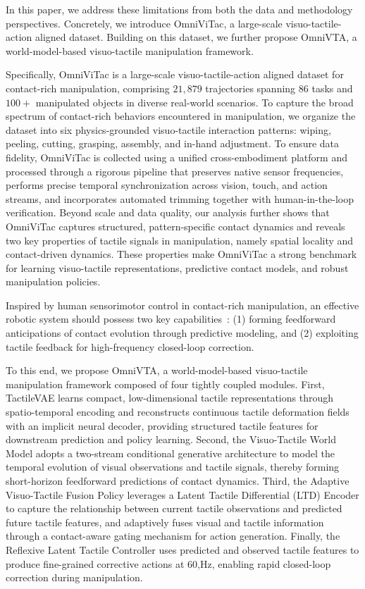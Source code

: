 In this paper, we address these limitations from both the data and methodology perspectives. Concretely, we introduce OmniViTac, a large-scale visuo-tactile-action aligned dataset.
Building on this dataset, we further propose OmniVTA, a world-model-based visuo-tactile manipulation framework.

Specifically, OmniViTac is a large-scale visuo-tactile-action aligned dataset for contact-rich manipulation, comprising $21,879$ trajectories spanning $86$ tasks and $100+$ manipulated objects in diverse real-world scenarios. To capture the broad spectrum of contact-rich behaviors encountered in manipulation, we organize the dataset into six physics-grounded visuo-tactile interaction patterns: wiping, peeling, cutting, grasping, assembly, and in-hand adjustment.
To ensure data fidelity, OmniViTac is collected using a unified cross-embodiment platform and processed through a rigorous pipeline that preserves native sensor frequencies, performs precise temporal synchronization across vision, touch, and action streams, and incorporates automated trimming together with human-in-the-loop verification. Beyond scale and data quality, our analysis further shows that OmniViTac captures structured, pattern-specific contact dynamics and reveals two key properties of tactile signals in manipulation, namely spatial locality and contact-driven dynamics. 
These properties make OmniViTac a strong benchmark for learning visuo-tactile representations, predictive contact models, and robust manipulation policies.

Inspired by human sensorimotor control in contact-rich manipulation, an effective robotic system should possess two key capabilities~\cite{wolpert2001motor}: (1) forming feedforward anticipations of contact evolution through predictive modeling, and (2) exploiting tactile feedback for high-frequency closed-loop correction.

To this end, we propose OmniVTA, a world-model-based visuo-tactile manipulation framework composed of four tightly coupled modules. First, TactileVAE learns compact, low-dimensional tactile representations through spatio-temporal encoding and reconstructs continuous tactile deformation fields with an implicit neural decoder, providing structured tactile features for downstream prediction and policy learning. Second, the Visuo-Tactile World Model adopts a two-stream conditional generative architecture to model the temporal evolution of visual observations and tactile signals, thereby forming short-horizon feedforward predictions of contact dynamics. Third, the Adaptive Visuo-Tactile Fusion Policy leverages a Latent Tactile Differential (LTD) Encoder to capture the relationship between current tactile observations and predicted future tactile features, and adaptively fuses visual and tactile information through a contact-aware gating mechanism for action generation. Finally, the Reflexive Latent Tactile Controller uses predicted and observed tactile features to produce fine-grained corrective actions at 60,Hz, enabling rapid closed-loop correction during manipulation.

